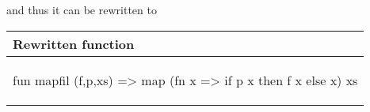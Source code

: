 \begin{example}
  \noindent
  and thus it can be rewritten to
  
  \begin{center}
    \begin{tabular}{|l|}
      \hline
      \textbf{Rewritten function} \\ \hline
      \begin{sml}
fun mapfil (f,p,xs) => map (fn x => if p x then f x else x) xs
      \end{sml} \\ \hline      
    \end{tabular}
  \end{center}
\end{example}



